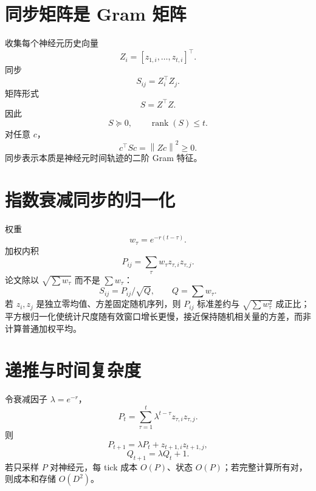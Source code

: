 \documentclass[UTF8,12pt,a4paper,fontset=none]{ctexart}
\numberwithin{equation}{section}
\newcommand{\norm}[1]{\left\lVert #1\right\rVert}
\newcommand{\rank}{\operatorname{rank}}
\begin{document}
\section{同步矩阵是 Gram 矩阵}
收集每个神经元历史向量
\begin{equation}
 Z_i=[z_{1,i},\ldots,z_{t,i}]^\top.
\end{equation}
同步
\begin{equation}
 S_{ij}=Z_i^\top Z_j.
\end{equation}
矩阵形式
\begin{equation}
 S=Z^\top Z.
\end{equation}
因此
\begin{equation}
 S\succeq0,
 \qquad \rank(S)\le t.
\end{equation}
对任意 $c$，
\begin{equation}
 c^\top Sc=\norm{Zc}^2\ge0.
\end{equation}
同步表示本质是神经元时间轨迹的二阶 Gram 特征。

\section{指数衰减同步的归一化}
权重
\begin{equation}
 w_\tau=e^{-r(t-\tau)}.
\end{equation}
加权内积
\begin{equation}
 P_{ij}=\sum_\tau w_\tau z_{\tau,i}z_{\tau,j}.
\end{equation}
论文除以 $\sqrt{\sum w_\tau}$ 而不是 $\sum w_\tau$：
\begin{equation}
 S_{ij}=P_{ij}/\sqrt{Q},
 \qquad Q=\sum w_\tau.
\end{equation}
若 $z_i,z_j$ 是独立零均值、方差固定随机序列，则 $P_{ij}$ 标准差约与 $\sqrt{\sum w_\tau^2}$ 成正比；平方根归一化使统计尺度随有效窗口增长更慢，接近保持随机相关量的方差，而非计算普通加权平均。

\section{递推与时间复杂度}
令衰减因子 $\lambda=e^{-r}$，
\begin{equation}
 P_t=\sum_{\tau=1}^{t}\lambda^{t-\tau}z_{\tau,i}z_{\tau,j}.
\end{equation}
则
\begin{equation}
 P_{t+1}=\lambda P_t+z_{t+1,i}z_{t+1,j},
\end{equation}
\begin{equation}
 Q_{t+1}=\lambda Q_t+1.
\end{equation}
若只采样 $P$ 对神经元，每 tick 成本 $O(P)$、状态 $O(P)$；若完整计算所有对，则成本和存储 $O(D^2)$。
\end{document}
